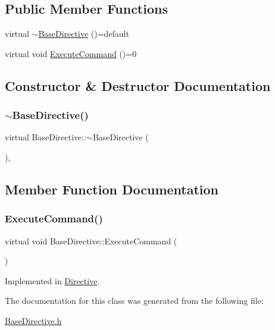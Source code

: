 \subsection*{Public Member Functions}
\begin{DoxyCompactItemize}
\item 
virtual \mbox{\hyperlink{class_base_directive_adc277b1b7d8c63c56d45e8dcdd5a7c22}{$\sim$\+Base\+Directive}} ()=default
\item 
virtual void \mbox{\hyperlink{class_base_directive_ad831e5fde8d6efddaad1cec04075f3cd}{Execute\+Command}} ()=0
\end{DoxyCompactItemize}


\subsection{Constructor \& Destructor Documentation}
\mbox{\label{class_base_directive_adc277b1b7d8c63c56d45e8dcdd5a7c22}} 
\subsubsection{\texorpdfstring{$\sim$BaseDirective()}{~BaseDirective()}}
{\footnotesize\ttfamily virtual Base\+Directive\+::$\sim$\+Base\+Directive (\begin{DoxyParamCaption}{ }\end{DoxyParamCaption})\hspace{0.3cm}{\ttfamily [virtual]}, {\ttfamily [default]}}



\subsection{Member Function Documentation}
\mbox{\label{class_base_directive_ad831e5fde8d6efddaad1cec04075f3cd}} 
\subsubsection{\texorpdfstring{ExecuteCommand()}{ExecuteCommand()}}
{\footnotesize\ttfamily virtual void Base\+Directive\+::\+Execute\+Command (\begin{DoxyParamCaption}{ }\end{DoxyParamCaption})\hspace{0.3cm}{\ttfamily [pure virtual]}}



Implemented in \mbox{\hyperlink{class_directive_a4297adea8d9504bb3b863829cea1b286}{Directive}}.



The documentation for this class was generated from the following file\+:\begin{DoxyCompactItemize}
\item 
\mbox{\hyperlink{_base_directive_8h}{Base\+Directive.\+h}}\end{DoxyCompactItemize}

